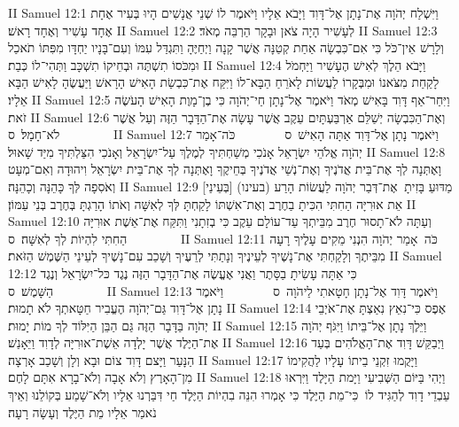 II Samuel 12:1	וַיִּשְׁלַח יְהֹוָה אֶת־נָתָן אֶל־דָּוִד וַיָּבֹא אֵלָיו וַיֹּאמֶר לוֹ שְׁנֵי אֲנָשִׁים הָיוּ בְּעִיר אֶחָת אֶחָד עָשִׁיר וְאֶחָד רָאשׁ׃
II Samuel 12:2	לְעָשִׁיר הָיָה צֹאן וּבָקָר הַרְבֵּה מְאֹד׃
II Samuel 12:3	וְלָרָשׁ אֵין־כֹּל כִּי אִם־כִּבְשָׂה אַחַת קְטַנָּה אֲשֶׁר קָנָה וַיְחַיֶּהָ וַתִּגְדַּל עִמּוֹ וְעִם־בָּנָיו יַחְדָּו מִפִּתּוֹ תֹאכַל וּמִכֹּסוֹ תִשְׁתֶּה וּבְחֵיקוֹ תִשְׁכָּב וַתְּהִי־לוֹ כְּבַת׃
II Samuel 12:4	וַיָּבֹא הֵלֶךְ לְאִישׁ הֶעָשִׁיר וַיַּחְמֹל לָקַחַת מִצֹּאנוֹ וּמִבְּקָרוֹ לַעֲשׂוֹת לָאֹרֵחַ הַבָּא־לוֹ וַיִּקַּח אֶת־כִּבְשַׂת הָאִישׁ הָרָאשׁ וַיַּעֲשֶׂהָ לָאִישׁ הַבָּא אֵלָיו׃
II Samuel 12:5	וַיִּחַר־אַף דָּוִד בָּאִישׁ מְאֹד וַיֹּאמֶר אֶל־נָתָן חַי־יְהֹוָה כִּי בֶן־מָוֶת הָאִישׁ הָעֹשֶׂה זֹאת׃
II Samuel 12:6	וְאֶת־הַכִּבְשָׂה יְשַׁלֵּם אַרְבַּעְתָּיִם עֵקֶב אֲשֶׁר עָשָׂה אֶת־הַדָּבָר הַזֶּה וְעַל אֲשֶׁר לֹא־חָמָל׃ {ס}        
II Samuel 12:7	וַיֹּאמֶר נָתָן אֶל־דָּוִד אַתָּה הָאִישׁ {ס}        כֹּה־אָמַר יְהֹוָה אֱלֹהֵי יִשְׂרָאֵל אָנֹכִי מְשַׁחְתִּיךָ לְמֶלֶךְ עַל־יִשְׂרָאֵל וְאָנֹכִי הִצַּלְתִּיךָ מִיַּד שָׁאוּל׃
II Samuel 12:8	וָאֶתְּנָה לְךָ אֶת־בֵּית אֲדֹנֶיךָ וְאֶת־נְשֵׁי אֲדֹנֶיךָ בְּחֵיקֶךָ וָאֶתְּנָה לְךָ אֶת־בֵּית יִשְׂרָאֵל וִיהוּדָה וְאִם־מְעָט וְאֹסִפָה לְּךָ כָּהֵנָּה וְכָהֵנָּה׃
II Samuel 12:9	מַדּוּעַ בָּזִיתָ  אֶת־דְּבַר יְהֹוָה לַעֲשׂוֹת הָרַע (בעינו) [בְּעֵינַי] אֵת אוּרִיָּה הַחִתִּי הִכִּיתָ בַחֶרֶב וְאֶת־אִשְׁתּוֹ לָקַחְתָּ לְּךָ לְאִשָּׁה וְאֹתוֹ הָרַגְתָּ בְּחֶרֶב בְּנֵי עַמּוֹן׃
II Samuel 12:10	וְעַתָּה לֹא־תָסוּר חֶרֶב מִבֵּיתְךָ עַד־עוֹלָם עֵקֶב כִּי בְזִתָנִי וַתִּקַּח אֶת־אֵשֶׁת אוּרִיָּה הַחִתִּי לִהְיוֹת לְךָ לְאִשָּׁה׃ {ס}        
II Samuel 12:11	כֹּה  אָמַר יְהֹוָה הִנְנִי מֵקִים עָלֶיךָ רָעָה מִבֵּיתֶךָ וְלָקַחְתִּי אֶת־נָשֶׁיךָ לְעֵינֶיךָ וְנָתַתִּי לְרֵעֶיךָ וְשָׁכַב עִם־נָשֶׁיךָ לְעֵינֵי הַשֶּׁמֶשׁ הַזֹּאת׃
II Samuel 12:12	כִּי אַתָּה עָשִׂיתָ בַסָּתֶר וַאֲנִי אֶעֱשֶׂה אֶת־הַדָּבָר הַזֶּה נֶגֶד כּל־יִשְׂרָאֵל וְנֶגֶד הַשָּׁמֶשׁ׃ {ס}        
II Samuel 12:13	וַיֹּאמֶר דָּוִד אֶל־נָתָן חָטָאתִי לַיהֹוָה {ס}        וַיֹּאמֶר נָתָן אֶל־דָּוִד גַּם־יְהֹוָה הֶעֱבִיר חַטָּאתְךָ לֹא תָמוּת׃
II Samuel 12:14	אֶפֶס כִּי־נִאֵץ נִאַצְתָּ אֶת־אֹיְבֵי יְהֹוָה בַּדָּבָר הַזֶּה גַּם הַבֵּן הַיִּלּוֹד לְךָ מוֹת יָמוּת׃
II Samuel 12:15	וַיֵּלֶךְ נָתָן אֶל־בֵּיתוֹ וַיִּגֹּף יְהֹוָה אֶת־הַיֶּלֶד אֲשֶׁר יָלְדָה אֵשֶׁת־אוּרִיָּה לְדָוִד וַיֵּאָנַשׁ׃
II Samuel 12:16	וַיְבַקֵּשׁ דָּוִד אֶת־הָאֱלֹהִים בְּעַד הַנָּעַר וַיָּצם דָּוִד צוֹם וּבָא וְלָן וְשָׁכַב אָרְצָה׃
II Samuel 12:17	וַיָּקֻמוּ זִקְנֵי בֵיתוֹ עָלָיו לַהֲקִימוֹ מִן־הָאָרֶץ וְלֹא אָבָה וְלֹא־בָרָא אִתָּם לָחֶם׃
II Samuel 12:18	וַיְהִי בַּיּוֹם הַשְּׁבִיעִי וַיָּמת הַיָּלֶד וַיִּרְאוּ עַבְדֵי דָוִד לְהַגִּיד לוֹ  כִּי־מֵת הַיֶּלֶד כִּי אָמְרוּ הִנֵּה בִהְיוֹת הַיֶּלֶד חַי דִּבַּרְנוּ אֵלָיו וְלֹא־שָׁמַע בְּקוֹלֵנוּ וְאֵיךְ נֹאמַר אֵלָיו מֵת הַיֶּלֶד וְעָשָׂה רָעָה׃
